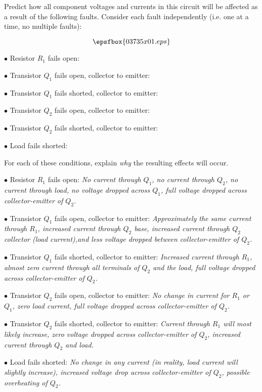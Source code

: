 

Predict how all component voltages and currents in this circuit will be affected as a result of the following faults.  Consider each fault independently (i.e. one at a time, no multiple faults):

$$\epsfbox{03735x01.eps}$$

\medskip
\item{$\bullet$} Resistor $R_1$ fails open:
\vskip 5pt
\item{$\bullet$} Transistor $Q_1$ fails open, collector to emitter:
\vskip 5pt
\item{$\bullet$} Transistor $Q_1$ fails shorted, collector to emitter:
\vskip 5pt
\item{$\bullet$} Transistor $Q_2$ fails open, collector to emitter:
\vskip 5pt
\item{$\bullet$} Transistor $Q_2$ fails shorted, collector to emitter:
\vskip 5pt
\item{$\bullet$} Load fails shorted:
\medskip

For each of these conditions, explain {\it why} the resulting effects will occur.







\medskip
\item{$\bullet$} Resistor $R_1$ fails open: {\it No current through $Q_1$, no current through $Q_2$, no current through load, no voltage dropped across $Q_1$, full voltage dropped across collector-emitter of $Q_2$.}
\vskip 5pt
\item{$\bullet$} Transistor $Q_1$ fails open, collector to emitter: {\it Approximately the same current through $R_1$, increased current through $Q_2$ base, increased current through $Q_2$ collector (load current),and less voltage dropped between collector-emitter of $Q_2$.}
\vskip 5pt
\item{$\bullet$} Transistor $Q_1$ fails shorted, collector to emitter: {\it Increased current through $R_1$, almost zero current through all terminals of $Q_2$ and the load, full voltage dropped across collector-emitter of $Q_2$.}
\vskip 5pt
\item{$\bullet$} Transistor $Q_2$ fails open, collector to emitter: {\it No change in current for $R_1$ or $Q_1$, zero load current, full voltage dropped across collector-emitter of $Q_2$.}
\vskip 5pt
\item{$\bullet$} Transistor $Q_2$ fails shorted, collector to emitter: {\it Current through $R_1$ will most likely increase, zero voltage dropped across collector-emitter of $Q_2$, increased current through $Q_2$ and load.}
\vskip 5pt
\item{$\bullet$} Load fails shorted: {\it No change in any current (in reality, load current will slightly increase), increased voltage drop across collector-emitter of $Q_2$, possible overheating of $Q_2$.}
\medskip


